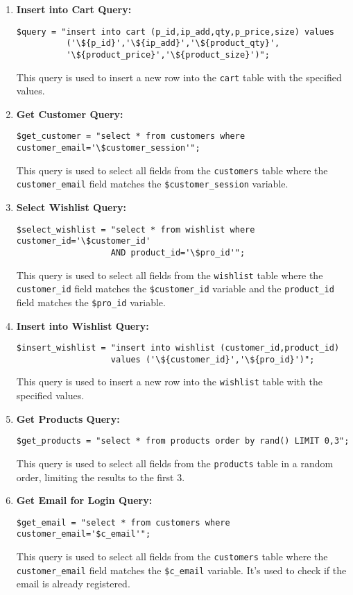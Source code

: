 \documentclass{article}
\begin{document}
\begin{enumerate}
    \item \textbf{Insert into Cart Query:}
    \begin{verbatim}
$query = "insert into cart (p_id,ip_add,qty,p_price,size) values 
          ('\${p_id}','\${ip_add}','\${product_qty}',
          '\${product_price}','\${product_size}')"; 
    \end{verbatim}
    This query is used to insert a new row into the \texttt{cart} table with the specified values.
    
    \item \textbf{Get Customer Query:}
    \begin{verbatim}
$get_customer = "select * from customers where customer_email='\$customer_session'";
    \end{verbatim}
    This query is used to select all fields from the \texttt{customers} table where the \texttt{customer\_email} field matches the \texttt{\$customer\_session} variable.
    
    \item \textbf{Select Wishlist Query:}
    \begin{verbatim}
$select_wishlist = "select * from wishlist where customer_id='\$customer_id' 
                   AND product_id='\$pro_id'";
    \end{verbatim}
    This query is used to select all fields from the \texttt{wishlist} table where the \texttt{customer\_id} field matches the \texttt{\$customer\_id} variable and the \texttt{product\_id} field matches the \texttt{\$pro\_id} variable.
    
    \item \textbf{Insert into Wishlist Query:}
    \begin{verbatim}
$insert_wishlist = "insert into wishlist (customer_id,product_id) 
                   values ('\${customer_id}','\${pro_id}')"; 
    \end{verbatim}
    This query is used to insert a new row into the \texttt{wishlist} table with the specified values.
    
    \item \textbf{Get Products Query:}
    \begin{verbatim}
$get_products = "select * from products order by rand() LIMIT 0,3";
    \end{verbatim}
    This query is used to select all fields from the \texttt{products} table in a random order, limiting the results to the first 3.
    
    
    \item \textbf{Get Email for Login Query:}
    \begin{verbatim}
$get_email = "select * from customers where customer_email='$c_email'";
    \end{verbatim}
    This query is used to select all fields from the \texttt{customers} table where the \texttt{customer\_email} field matches the \texttt{\$c\_email} variable. It's used to check if the email is already registered.
    

\end{enumerate}
\end{document}
